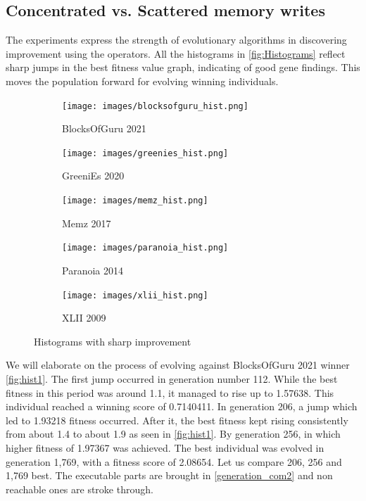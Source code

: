 \documentclass[dvipsnames,format=sigconf,anonymous=true,review=true]{acmart}
\begin{document}
\subsection{Concentrated vs. Scattered memory writes}
The experiments express the strength of evolutionary algorithms in discovering improvement using the operators. All the histograms in \autoref{fig:Histograms} reflect sharp jumps in the best fitness value graph, indicating of good gene findings. This moves the population forward for evolving winning individuals. 

\begin{figure}
  \centering
  \begin{subfigure}{0.33\textwidth}
    \texttt{[image: images/blocksofguru\_hist.png]}
    \caption{BlocksOfGuru 2021}
    \label{fig:hist1}
  \end{subfigure}
  \hfill
  \begin{subfigure}{0.33\textwidth}
    \texttt{[image: images/greenies\_hist.png]}
    \caption{GreeniEs 2020}
    \label{fig:hist2}
  \end{subfigure}
  \begin{subfigure}{0.33\textwidth}
    \texttt{[image: images/memz\_hist.png]}
    \caption{Memz 2017}
    \label{fig:hist3}
  \end{subfigure}
  \hfill
  \begin{subfigure}{0.33\textwidth}
    \texttt{[image: images/paranoia\_hist.png]}
    \caption{Paranoia 2014}
    \label{fig:hist4}
  \end{subfigure}
  \begin{subfigure}{0.33\textwidth}
    \texttt{[image: images/xlii\_hist.png]}
    \caption{XLII 2009}
    \label{fig:hist5}
  \end{subfigure}
  \caption{Histograms with sharp improvement}
  \label{fig:Histograms}
\end{figure}

We will elaborate on the process of evolving against BlocksOfGuru 2021 winner \autoref{fig:hist1}. The first jump occurred in generation number 112. While the best fitness in this period was around 1.1, it managed to rise up to 1.57638. This individual reached a winning score of 0.7140411. 
In generation 206, a jump which led to 1.93218 fitness occurred. After it, the best fitness kept rising consistently from about 1.4 to about 1.9 as seen in \autoref{fig:hist1}. By generation 256, in which higher fitness of 1.97367 was achieved. The best individual was evolved in generation 1,769, with a fitness score of 2.08654. Let us compare 206, 256 and 1,769 best. The executable parts are brought in \autoref{generation_com2} and non reachable ones are stroke through.
\end{document}

